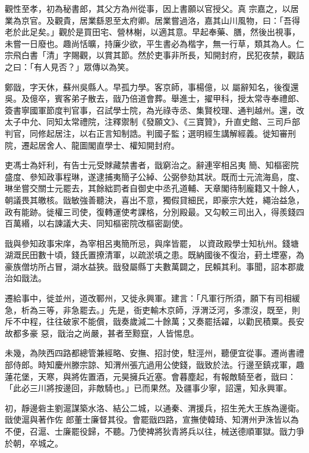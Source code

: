 \begin{pinyinscope}
 觀性至孝，初為秘書郎，其父方為州從事，因上書願以官授父。真
 宗嘉之，以居業為京官。及觀貴，居業繇恩至太府卿。居業嘗過洛，嘉其山川風物，曰：「吾得老於此足矣。」觀於是買田宅、營林榭，以適其意。早起奉藥、膳，然後出視事，未嘗一日廢也。趣尚恬曠，持廉少欲，平生書必為楷字，無一行草，類其為人。仁宗飛白書「清」字賜觀，以賞其節。然於吏事非所長，知開封府，民犯夜禁，觀詰之曰：「有人見否？」眾傳以為笑。



 鄭戩，字天休，蘇州吳縣人。早孤力學。客京師，事楊億，以
 屬辭知名，後復還吳。及億卒，賓客弟子散去，戩乃倍道會葬。舉進士，擢甲科，授太常寺奉禮郎、簽書寧國軍節度判官事，召試學士院，為光祿寺丞、集賢校理、通判越州。還，改太子中允、同知太常禮院，注釋禦制《發願文》、《三寶贊》，升直史館、三司戶部判官，同修起居注，以右正言知制誥。判國子監；選明經生講解經義。徙知審刑院，遷起居舍人、龍圖閣直學士、權知開封府。



 吏馮士為奸利，有告士元受賕藏禁書者，戩窮治之。辭連宰相呂夷
 簡、知樞密院盛度、參知政事程琳，遂逮捕夷簡子公綽、公弼參劾其狀。既而士元流海島，度、琳坐嘗交關士元罷去，其餘絀罰者自御史中丞孔道輔、天章閣待制龐籍又十餘人，朝議畏其皦核。戩敏強善聽決，喜出不意，獨假貸細民，即豪宗大姓，繩治益急，政有能跡。徙權三司使，復轉運使考課格，分別殿最。又勾較三司出入，得羨錢四百萬緡，以右諫議大夫、同知樞密院改樞密副使。



 戩與參知政事宋庠，為宰相呂夷簡所忌，與庠皆罷，
 以資政殿學士知杭州。錢塘湖溉民田數十頃，錢氏置撩清軍，以疏淤填之患。既納國後不復治，葑土堙塞，為豪族僧坊所占冒，湖水益狹。戩發屬縣丁夫數萬闢之，民賴其利。事聞，詔本郡歲治如戩法。



 遷給事中，徙並州，道改鄆州，又徙永興軍。建言：「凡軍行所須，願下有司相緩急，析為三等，非急罷去。」先是，衙吏輸木京師，浮渭泛河，多漂沒，既至，則斥不中程，往往破家不能償，戩奏歲減二十餘萬；又奏罷括糴，以勸民積粟。長安故都多豪
 惡，戩治之尚嚴，甚者至黥竄，人皆惕息。



 未幾，為陜西四路都總管兼經略、安撫、招討使，駐涇州，聽便宜從事。遷尚書禮部侍郎。時知慶州滕宗諒、知渭州張亢過用公使錢，戩致於法。行邊至鎮戎軍，趣蓮花堡，天寒，與將佐置酒，元昊擁兵近塞。會暮塵起，有報敵騎至者，戩曰：「此必三川將按邊回，非敵騎也。」已而果然。及疆事少寧，詔還，知永興軍。



 初，靜邊砦主劉滬謀築水洛、結公二城，以通秦、渭援兵，招生羌大王族為邊衛。戩使滬與著作佐
 郎董士廉督其役。會罷戩四路，宣撫使韓琦、知渭州尹洙皆以為不便，召滬、士廉罷役歸，不聽。乃使裨將狄青將兵以往，械送德順軍獄。戩力爭於朝，卒城之。




\end{pinyinscope}
